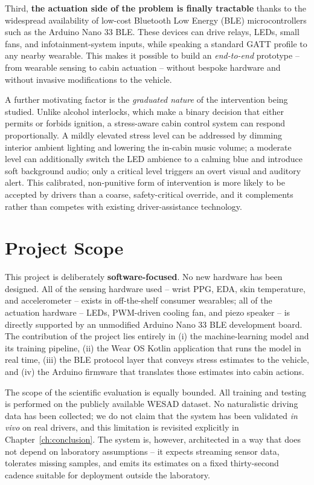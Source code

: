 Third, \textbf{the actuation side of the problem is finally tractable}
thanks to the widespread availability of low-cost Bluetooth Low Energy
(BLE) microcontrollers such as the Arduino Nano 33 BLE. These devices
can drive relays, LEDs, small fans, and infotainment-system inputs,
while speaking a standard GATT profile to any nearby wearable. This
makes it possible to build an \emph{end-to-end} prototype -- from
wearable sensing to cabin actuation -- without bespoke hardware and
without invasive modifications to the vehicle.

A further motivating factor is the \emph{graduated nature} of the
intervention being studied. Unlike alcohol interlocks, which make a
binary decision that either permits or forbids ignition, a stress-aware
cabin control system can respond proportionally. A mildly elevated
stress level can be addressed by dimming interior ambient lighting
and lowering the in-cabin music volume; a moderate level can additionally
switch the LED ambience to a calming blue and introduce soft background
audio; only a critical level triggers an overt visual and auditory
alert. This calibrated, non-punitive form of intervention is more
likely to be accepted by drivers than a coarse, safety-critical
override, and it complements rather than competes with existing
driver-assistance technology.

\section{Project Scope}
\label{sec:scope}

This project is deliberately \textbf{software-focused}. No new hardware
has been designed. All of the sensing hardware used -- wrist PPG, EDA,
skin temperature, and accelerometer -- exists in off-the-shelf consumer
wearables; all of the actuation hardware -- LEDs, PWM-driven cooling
fan, and piezo speaker -- is directly supported by an unmodified Arduino
Nano 33 BLE development board. The contribution of the project lies
entirely in (i) the machine-learning model and its training pipeline,
(ii) the Wear OS Kotlin application that runs the model in real time,
(iii) the BLE protocol layer that conveys stress estimates to the
vehicle, and (iv) the Arduino firmware that translates those estimates
into cabin actions.

The scope of the scientific evaluation is equally bounded. All training
and testing is performed on the publicly available WESAD dataset. No
naturalistic driving data has been collected; we do not claim that the
system has been validated \emph{in vivo} on real drivers, and this
limitation is revisited explicitly in Chapter~\ref{ch:conclusion}.
The system is, however, architected in a way that does not depend on
laboratory assumptions -- it expects streaming sensor data, tolerates
missing samples, and emits its estimates on a fixed thirty-second
cadence suitable for deployment outside the laboratory.

